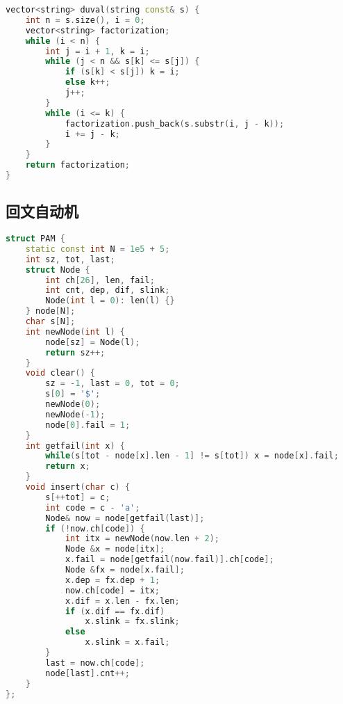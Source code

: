 \begin{lstlisting}[language=C++]
vector<string> duval(string const& s) {
    int n = s.size(), i = 0;
    vector<string> factorization;
    while (i < n) {
        int j = i + 1, k = i;
        while (j < n && s[k] <= s[j]) {
            if (s[k] < s[j]) k = i;
            else k++;
            j++;
        }
        while (i <= k) {
            factorization.push_back(s.substr(i, j - k));
            i += j - k;
        }
    }
    return factorization;
}
\end{lstlisting}

\subsection{回文自动机}

\begin{lstlisting}[language=C++]
struct PAM {
    static const int N = 1e5 + 5;
    int sz, tot, last;
    struct Node {
        int ch[26], len, fail;
        int cnt, dep, dif, slink;
        Node(int l = 0): len(l) {}
    } node[N];
    char s[N];
    int newNode(int l) {
        node[sz] = Node(l);
        return sz++;
    }
    void clear() {
        sz = -1, last = 0, tot = 0;
        s[0] = '$';
        newNode(0);
        newNode(-1);
        node[0].fail = 1;
    }
    int getfail(int x) {
        while(s[tot - node[x].len - 1] != s[tot]) x = node[x].fail;
        return x;
    }
    void insert(char c) {
        s[++tot] = c;
        int code = c - 'a';
        Node& now = node[getfail(last)];
        if (!now.ch[code]) {
            int itx = newNode(now.len + 2);
            Node &x = node[itx];
            x.fail = node[getfail(now.fail)].ch[code];
            Node &fx = node[x.fail];
            x.dep = fx.dep + 1;
            now.ch[code] = itx;
            x.dif = x.len - fx.len;
            if (x.dif == fx.dif)
                x.slink = fx.slink;
            else
                x.slink = x.fail;
        }
        last = now.ch[code];
        node[last].cnt++;
    }
};    
\end{lstlisting}